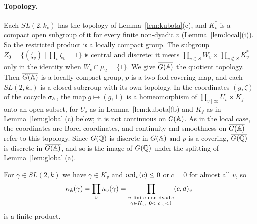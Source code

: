 \paragraph{Topology.} Each $\overline{SL(2,k_v)}$ has the topology of
Lemma~\ref{lem:kubota}(c), and $K_v^*$ is a compact open subgroup of it
for every finite non-dyadic $v$ (Lemma~\ref{lem:local}(i)). So the
restricted product is a locally compact group. The subgroup
$Z_0=\{(\zeta_v)\mid\prod_v\zeta_v=1\}$ is central and discrete: it meets
$\prod_{v\in S}W_v\times\prod_{v\notin S}K_v^*$ only in the identity when
$W_v\cap\mu_2=\{1\}$. We give $\overline{G(\mathbb{A})}$ the quotient topology.
Then $\overline{G(\mathbb{A})}$ is a locally compact group, $p$ is a two-fold
covering map, and each $\overline{SL(2,k_v)}$ is a closed subgroup with
its own topology. In the coordinates $(g,\zeta)$ of the cocycle
$\sigma_{\mathbb{A}}$, the map $g\mapsto(g,1)$ is a homeomorphism of
$\prod_{v\mid\infty}U_v\times K_f$ onto an open subset, for $U_v$ as in
Lemma~\ref{lem:kubota}(b) and $K_f$ as in Lemma~\ref{lem:global}(c) below;
it is not continuous on $G(\mathbb{A})$. As in the local case, the coordinates
are Borel coordinates, and continuity and smoothness on $\overline{G(\mathbb{A})}$
refer to this topology. Since $G(\mathbb{Q})$ is discrete in $G(\mathbb{A})$ and $p$ is a
covering, $\overline{G(\mathbb{Q})}$ is discrete in $\overline{G(\mathbb{A})}$, and so is
the image of $G(\mathbb{Q})$ under the splitting of Lemma~\ref{lem:global}(a).

For $\gamma\in SL(2,k)$ we have $\gamma\in K_v$ and
$\operatorname{ord}_v(c)\le0$ or $c=0$ for almost all $v$, so
\begin{equation}\label{eq:kappa-A}
\kappa_\A(\gamma)=\prod_v\kappa_v(\gamma)
=\prod_{\substack{v\ \text{finite non-dyadic}\\ \gamma\in K_v,\ 0<|c|_v<1}}(c,d)_v
\end{equation}
is a finite product.

